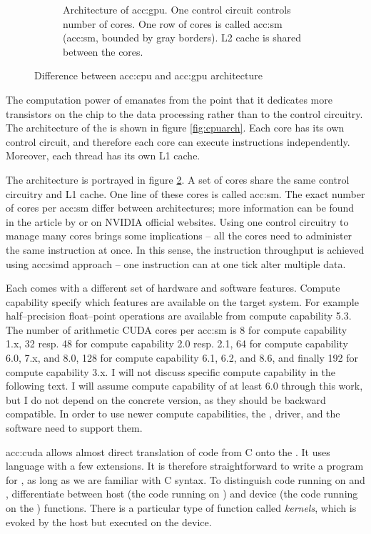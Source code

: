 \begin{figure}
\begin{subfigure}[t]{0.47\textwidth}
        \caption{Architecture of \acrshort*{acc:gpu}. One control circuit controls number of cores. One row of cores is called \acrlong{acc:sm} (\acrshort{acc:sm}, bounded by gray borders). L2 cache is shared between the cores.}
        \label{fig:gpuarch}
    \end{subfigure}
    \caption{Difference between \acrshort*{acc:cpu} and \acrshort*{acc:gpu} architecture}
\end{figure}

The computation power of \gpu emanates from the point that it dedicates more transistors on the chip to the data processing rather than to the control circuitry. The architecture of the \cpu is shown in figure \ref{fig:cpuarch}. Each core has its own control circuit, and therefore each core can execute instructions independently. Moreover, each thread has its own L1 cache.

The \gpu{} architecture is portrayed in figure \ref{fig:gpuarch}. A set of cores share the same control circuitry and L1 cache. One line of these cores is called \acrfull{acc:sm}. The exact number of cores per \acrshort{acc:sm} differ between architectures; more information can be found in the article by \citet{NVIDIAhistory} or on NVIDIA official websites. Using one control circuitry to manage many cores brings some implications -- all the cores need to administer the same instruction at once. In this sense, the instruction throughput is achieved using \acrfull{acc:simd} approach -- one instruction can at one tick alter multiple data.

Each \gpu comes with a different set of hardware and software features. Compute capability specify which features are available on the target system. For example half--precision float--point operations are available from compute capability 5.3. The number of arithmetic CUDA cores per \acrshort{acc:sm} is 8 for compute capability 1.x, 32 resp. 48 for compute capability 2.0 resp. 2.1, 64 for compute capability 6.0, 7.x, and 8.0, 128 for compute capability 6.1, 6.2, and 8.6, and finally 192 for compute capability 3.x. I will not discuss specific compute capability in the following text. I will assume compute capability of at least 6.0 through this work, but I do not depend on the concrete version, as they should be backward compatible. In order to use newer compute capabilities, the \gpu, driver, and the software need to support them.

\acrlong{acc:cuda} allows almost direct translation of code from C onto the \gpu. It uses \cpp language with a few extensions. It is therefore straightforward to write a program for \gpuns, as long as we are familiar with C syntax. To distinguish code running on \cpu and \gpu, \cuda differentiate between host (the code running on \cpu) and device (the code running on the \gpu) functions. There is a particular type of function called \emph{kernels}, which is evoked by the host but executed on the device.

